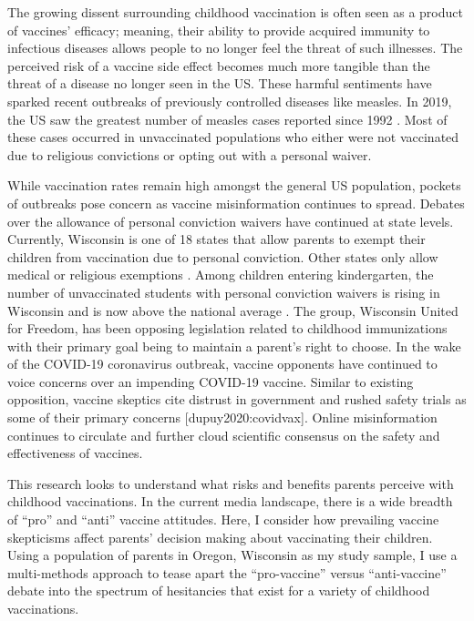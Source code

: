 \documentclass[12pt,]{article}
\begin{document}
The growing dissent surrounding childhood vaccination is often seen as a product of vaccines' efficacy; meaning, their ability to provide acquired immunity to infectious diseases allows people to no longer feel the threat of such illnesses. The perceived risk of a vaccine side effect becomes much more tangible than the threat of a disease no longer seen in the US. These harmful sentiments have sparked recent outbreaks of previously controlled diseases like measles. In 2019, the US saw the greatest number of measles cases reported since 1992 \autocite{patel2019:measles}. Most of these cases occurred in unvaccinated populations who either were not vaccinated due to religious convictions or opting out with a personal waiver.

While vaccination rates remain high amongst the general US population, pockets of outbreaks pose concern as vaccine misinformation continues to spread. Debates over the allowance of personal conviction waivers have continued at state levels. Currently, Wisconsin is one of 18 states that allow parents to exempt their children from vaccination due to personal conviction. Other states only allow medical or religious exemptions \autocite{carlson2019:conviction}. Among children entering kindergarten, the number of unvaccinated students with personal conviction waivers is rising in Wisconsin and is now above the national average \autocite{carlson2019:conviction}. The group, Wisconsin United for Freedom, has been opposing legislation related to childhood immunizations with their primary goal being to maintain a parent's right to choose.
In the wake of the COVID-19 coronavirus outbreak, vaccine opponents have continued to voice concerns over an impending COVID-19 vaccine. Similar to existing opposition, vaccine skeptics cite distrust in government and rushed safety trials as some of their primary concerns {[}dupuy2020:covidvax{]}. Online misinformation continues to circulate and further cloud scientific consensus on the safety and effectiveness of vaccines.

This research looks to understand what risks and benefits parents perceive with childhood vaccinations. In the current media landscape, there is a wide breadth of ``pro'' and ``anti'' vaccine attitudes. Here, I consider how prevailing vaccine skepticisms affect parents' decision making about vaccinating their children. Using a population of parents in Oregon, Wisconsin as my study sample, I use a multi-methods approach to tease apart the ``pro-vaccine'' versus ``anti-vaccine'' debate into the spectrum of hesitancies that exist for a variety of childhood vaccinations.
\end{document}
